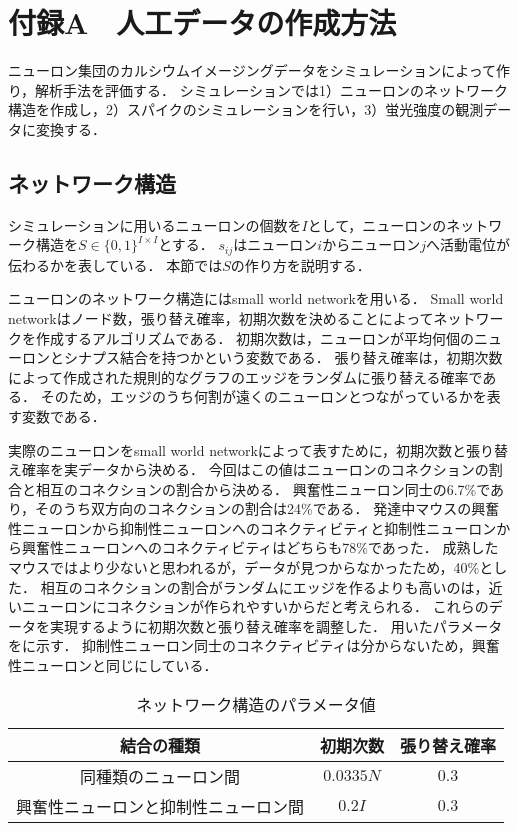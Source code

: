 \chapter{付録A　人工データの作成方法}
ニューロン集団のカルシウムイメージングデータをシミュレーションによって作り，解析手法を評価する．
シミュレーションでは1）ニューロンのネットワーク構造を作成し，2）スパイクのシミュレーションを行い，3）蛍光強度の観測データに変換する．
\section{ネットワーク構造}
シミュレーションに用いるニューロンの個数を$I$として，ニューロンのネットワーク構造を$S \in \{0, 1\}^{I \times I}$とする．
$s_{ij}$はニューロン$i$からニューロン$j$へ活動電位が伝わるかを表している．
本節では$S$の作り方を説明する．

ニューロンのネットワーク構造にはsmall world network\cite{Watts1998}を用いる．
Small world networkはノード数，張り替え確率，初期次数を決めることによってネットワークを作成するアルゴリズムである．
初期次数は，ニューロンが平均何個のニューロンとシナプス結合を持つかという変数である．
張り替え確率は，初期次数によって作成された規則的なグラフのエッジをランダムに張り替える確率である．
そのため，エッジのうち何割が遠くのニューロンとつながっているかを表す変数である．

実際のニューロンをsmall world networkによって表すために，初期次数と張り替え確率を実データから決める．
今回はこの値はニューロンのコネクションの割合と相互のコネクションの割合から決める．
興奮性ニューロン同士の6.7\%であり，そのうち双方向のコネクションの割合は24\%である\cite{Jouhanneau2015}．
発達中マウスの興奮性ニューロンから抑制性ニューロンへのコネクティビティと抑制性ニューロンから興奮性ニューロンへのコネクティビティはどちらも78\%であった\cite{Holmgren2003}．
成熟したマウスではより少ないと思われるが，データが見つからなかったため，40\%とした．
相互のコネクションの割合がランダムにエッジを作るよりも高いのは，近いニューロンにコネクションが作られやすいからだと考えられる．
これらのデータを実現するように初期次数と張り替え確率を調整した．
用いたパラメータをに示す．
抑制性ニューロン同士のコネクティビティは分からないため，興奮性ニューロンと同じにしている．

\begin{table}[htb]
  \center
  \begin{tabular}{|c|cc|} \hline
    結合の種類 & 初期次数 & 張り替え確率 \\ \hline
		同種類のニューロン間 & $0.0335 N$ & $0.3$ \\
		興奮性ニューロンと抑制性ニューロン間 & $0.2I$ & $0.3$\\ \hline
  \end{tabular}
  \caption{ネットワーク構造のパラメータ値}
  \label{tab:parameter1}
\end{table}

